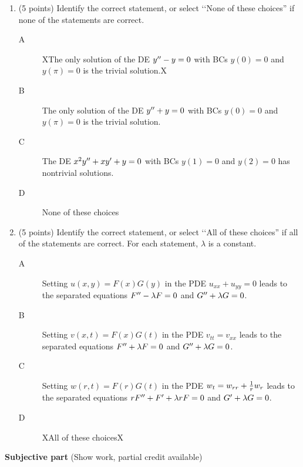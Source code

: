 \documentclass{article}
\begin{document}
\begin{enumerate}
\item (5 points)  Identify the correct statement, or select \lq\lq None of these choices'' if none of the statements are correct.
\begin{description}
\item[A] XThe only solution of the DE $y\sp{\prime\prime}-y=0$ with BCs $y(0)=0$ and $y(\pi)=0$ is the trivial solution.X
\item[B] The only solution of the DE $y\sp{\prime\prime}+y=0$ with BCs $y(0)=0$ and $y(\pi)=0$ is the trivial solution.
\item[C] The DE $x\sp2y\sp{\prime\prime}+xy\sp\prime+y=0$ with BCs $y(1)=0$ and $y(2)=0$ has nontrivial solutions.
\item[D] None of these choices
\end{description}

\item (5 points) Identify the correct statement, or select \lq\lq All of these choices'' if all of the statements are correct.  For each statement, $\lambda$ is a constant.
\begin{description}
\item[A] Setting $u(x,y)=F(x)G(y)$ in the PDE $u_{xx}+u_{yy}=0$ leads to the separated equations $F\sp{\prime\prime}-\lambda F=0$ and $G\sp{\prime\prime}+\lambda G=0$.
\item[B] Setting $v(x,t)=F(x)G(t)$ in the PDE $v_{tt}=v_{xx}$ leads to the separated equations $F\sp{\prime\prime}+\lambda F=0$ and $G\sp{\prime\prime}+\lambda G=0$.
\item[C] Setting $w(r,t)=F(r)G(t)$ in the PDE $w_{t}=w_{rr}+{1\over r}w_r$ leads to the separated equations $rF\sp{\prime\prime}+F\sp{\prime}+\lambda rF=0$ and $G\sp{\prime}+\lambda G=0$.
\item[D] XAll of these choicesX
\end{description}

\end{enumerate}

\newpage\noindent
{\bf Subjective part} (Show work, partial credit available)
\end{document}
